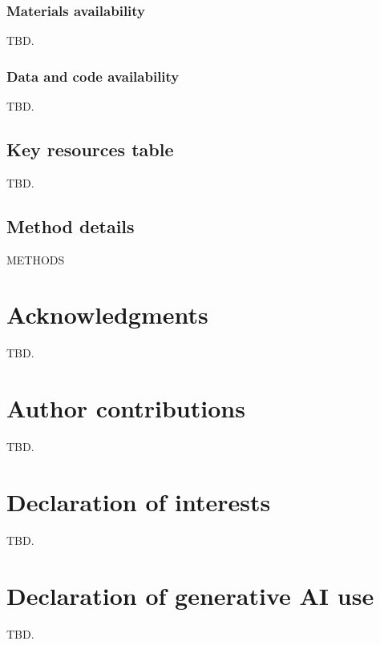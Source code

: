 \documentclass[11pt]{article}
\begin{document}
\subsubsection{Materials availability}
TBD.
\subsubsection{Data and code availability}
TBD. %
\subsection{Key resources table}
TBD. %
\subsection{Method details}
{METHODS}

\section*{Acknowledgments}
TBD.

\section*{Author contributions}
TBD. %

\section*{Declaration of interests}
TBD.

\section*{Declaration of generative AI use}
TBD. %



\end{document}
